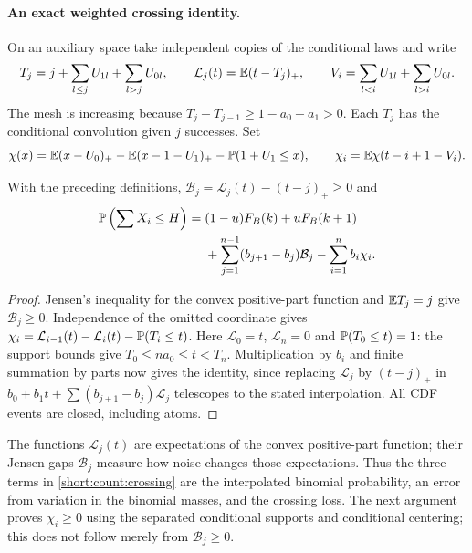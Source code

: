 \paragraph{An exact weighted crossing identity.}
On an auxiliary space take independent copies of the conditional laws and
write
\[
 T_j=j+\sum_{l\le j}U_{1l}+\sum_{l>j}U_{0l},\qquad
 \mathcal L_j(t)=\mathbb E(t-T_j)_+,\qquad
 V_i=\sum_{l<i}U_{1l}+\sum_{l>i}U_{0l}.
\]
The mesh is increasing because $T_j-T_{j-1}\ge1-a_0-a_1>0$.
Each $T_j$ has the conditional convolution given $j$ successes.
Set
\[
 \chi(x)=\mathbb E(x-U_0)_+-\mathbb E(x-1-U_1)_+-\mathbb P(1+U_1\le x),
 \qquad \chi_i=\mathbb E \chi(t-i+1-V_i).
\]
\begin{lemma}
\label{short:count:crossing-lemma}
With the preceding definitions, $\mathcal B_j=\mathcal L_j(t)-(t-j)_+\ge0$ and
\begin{align}
 \mathbb P\left(\sum X_i\le H\right)
 ={}&(1-u)F_B(k)+uF_B(k+1)\notag\\
 &+\sum_{j=1}^{n-1}(b_{j+1}-b_j)\mathcal B_j-\sum_{i=1}^n b_i \chi_i.
 \label{short:count:crossing}
\end{align}
\end{lemma}
\begin{proof}
Jensen's inequality for the convex positive-part function and
$\mathbb E T_j=j$ give $\mathcal B_j\ge0$. Independence of the omitted coordinate gives
$\chi_i=\mathcal L_{i-1}(t)-\mathcal L_i(t)-\mathbb P(T_i\le t)$.
Here $\mathcal L_0=t$, $\mathcal L_n=0$ and $\mathbb P(T_0\le t)=1$: the support bounds give
$T_0\le na_0\le t<T_n$. Multiplication by $b_i$ and finite summation
by parts now gives the identity, since replacing $\mathcal L_j$ by $(t-j)_+$ in
$b_0+b_1t+\sum(b_{j+1}-b_j)\mathcal L_j$ telescopes to the stated
interpolation. All CDF events are closed, including atoms.
\end{proof}
The functions $\mathcal L_j(t)$ are expectations of the convex
positive-part function; their Jensen gaps $\mathcal B_j$ measure how
noise changes those expectations. Thus the three terms in
\eqref{short:count:crossing} are the interpolated binomial probability,
an error from variation in the binomial masses, and the crossing loss.
The next argument proves $\chi_i\ge0$ using the
separated conditional supports and conditional centering; this does not
follow merely from $\mathcal B_j\ge0$.

